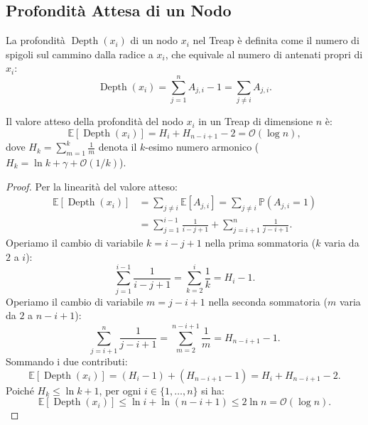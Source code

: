 \subsection{Profondit\`a Attesa di un Nodo}
La profondit\`a $\operatorname{Depth}(x_i)$ di un nodo $x_i$ nel Treap \`e definita come il numero di spigoli sul cammino dalla radice a $x_i$, che equivale al numero di antenati propri di $x_i$:
\begin{equation}
  \operatorname{Depth}(x_i) = \sum_{j=1}^n A_{j, i} - 1 = \sum_{j \neq i} A_{j, i}.
\end{equation}

\begin{theorem}
Il valore atteso della profondit\`a del nodo $x_i$ in un Treap di dimensione $n$ \`e:
\begin{equation}
  \mathbb{E}[\operatorname{Depth}(x_i)] = H_i + H_{n - i + 1} - 2 = \mathcal{O}(\log n),
\end{equation}
dove $H_k = \sum_{m=1}^k \frac{1}{m}$ denota il $k$-esimo numero armonico ($H_k = \ln k + \gamma + \mathcal{O}(1/k)$).
\end{theorem}

\begin{proof}
Per la linearit\`a del valore atteso:
\begin{align}
  \mathbb{E}[\operatorname{Depth}(x_i)] &= \sum_{j \neq i} \mathbb{E}[A_{j, i}] = \sum_{j \neq i} \mathbb{P}(A_{j, i} = 1) \nonumber \\
  &= \sum_{j=1}^{i-1} \frac{1}{i - j + 1} + \sum_{j=i+1}^n \frac{1}{j - i + 1}.
\end{align}
Operiamo il cambio di variabile $k = i - j + 1$ nella prima sommatoria ($k$ varia da $2$ a $i$):
\begin{equation}
  \sum_{j=1}^{i-1} \frac{1}{i - j + 1} = \sum_{k=2}^i \frac{1}{k} = H_i - 1.
\end{equation}
Operiamo il cambio di variabile $m = j - i + 1$ nella seconda sommatoria ($m$ varia da $2$ a $n - i + 1$):
\begin{equation}
  \sum_{j=i+1}^n \frac{1}{j - i + 1} = \sum_{m=2}^{n - i + 1} \frac{1}{m} = H_{n - i + 1} - 1.
\end{equation}
Sommando i due contributi:
\begin{equation}
  \mathbb{E}[\operatorname{Depth}(x_i)] = (H_i - 1) + (H_{n - i + 1} - 1) = H_i + H_{n - i + 1} - 2.
\end{equation}
Poich\'e $H_k \le \ln k + 1$, per ogni $i \in \{1, \dots, n\}$ si ha:
\begin{equation}
  \mathbb{E}[\operatorname{Depth}(x_i)] \le \ln i + \ln(n - i + 1) \le 2 \ln n = \mathcal{O}(\log n).
\end{equation}
\end{proof}

